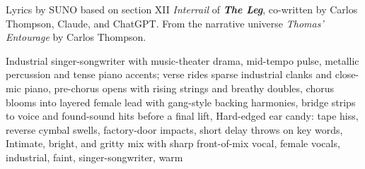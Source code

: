 
\begin{notes}
Lyrics by SUNO based on section XII \emph{Interrail} of \emph{\bfseries The Leg}, %
co-written by Carlos Thompson, Claude, and ChatGPT. %
From the narrative universe \emph{Thomas’ Entourage} by Carlos Thompson.
\end{notes}
\begin{style}
Industrial singer-songwriter with music-theater drama, mid-tempo pulse, metallic percussion and tense piano accents; verse rides sparse industrial clanks and close-mic piano, pre-chorus opens with rising strings and breathy doubles, chorus blooms into layered female lead with gang-style backing harmonies, bridge strips to voice and found-sound hits before a final lift, Hard-edged ear candy: tape hiss, reverse cymbal swells, factory-door impacts, short delay throws on key words, Intimate, bright, and gritty mix with sharp front-of-mix vocal, female vocals, industrial, faint, singer-songwriter, warm
\end{style}
